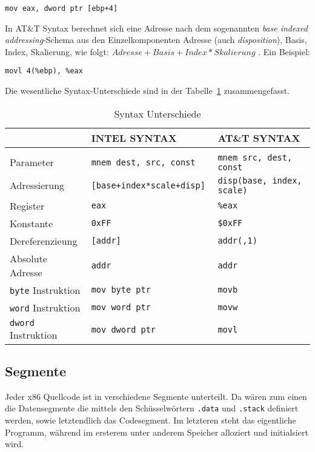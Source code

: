 \hspace{5mm} 
\texttt{mov eax, dword ptr [ebp+4]}

In AT\&T Syntax berechnet sich eine Adresse nach dem sogenannten \emph{base
indexed addressing}-Schema aus den Einzelkomponenten Adresse (auch
\emph{disposition}), Basis, Index, Skalierung, wie folgt: $Adresse + Basis +
Index*Skalierung$ . Ein Beispiel:

\hspace{5mm} 
\texttt{movl 4(\%ebp), \%eax}

Die wesentliche Syntax-Unterschiede sind in der Tabelle~\ref{tab:syntaxdiffs}
zusammengefasst.


\begin{table}[h]	%
\begin{tabular}{lll}
\\	                          & INTEL SYNTAX                  & AT\&T SYNTAX
\\\hline
\\	Parameter 								& \tt mnem dest, src, const  	  & \tt mnem src, dest, const
\\Adressierung  				    	&	\tt [base+index*scale+disp]   & \tt disp(base, index, scale)
\\	Register      						& \tt eax              					& \tt \%eax
\\	Konstante     						& \tt 0xFF             					& \tt \$0xFF
\\	Dereferenzieung   				& \tt [addr]           					& \tt addr(,1)
\\	Absolute Adresse 			 	  & \tt addr             					& \tt *addr
\\	{\tt byte} Instruktion    & \tt mov byte ptr     					& \tt movb
\\	{\tt word} Instruktion    & \tt mov word ptr     					& \tt movw
\\{\tt dword} Instruktion     & \tt mov dword ptr    					& \tt movl
\end{tabular}
\caption{Syntax Unterschiede} \label{tab:syntaxdiffs}
\end{table}



\subsection{Segmente} Jeder x86 Quellcode ist in verschiedene Segmente
unterteilt. Da wären zum einen die Datensegmente die mittels den
Schüsselwörtern \texttt{.data} und \texttt{.stack} definiert werden, sowie
letztendlich das Codesegment. Im letzteren steht das eigentliche Programm,
während im ersterem unter anderem Speicher alloziert und initialsiert wird.
